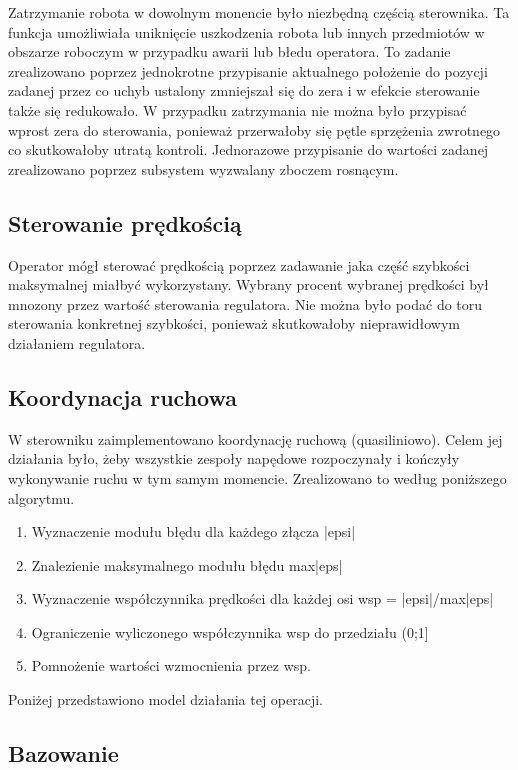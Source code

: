 Zatrzymanie robota w dowolnym monencie było niezbędną częścią sterownika. Ta funkcja umożliwiała uniknięcie uszkodzenia robota lub innych przedmiotów w obszarze roboczym w przypadku awarii lub błedu operatora. To zadanie zrealizowano poprzez jednokrotne przypisanie aktualnego położenie do pozycji zadanej przez co uchyb ustalony zmniejszał się do zera i w efekcie sterowanie także się redukowało. W przypadku zatrzymania nie można było przypisać wprost zera do sterowania, ponieważ przerwałoby się pętle sprzężenia zwrotnego co skutkowałoby utratą kontroli.
Jednorazowe przypisanie do wartości zadanej zrealizowano poprzez subsystem wyzwalany zboczem rosnącym.

\subsection{Sterowanie prędkością}
\label{subsec:sterowaniePredkoscia}

Operator mógł sterować prędkością poprzez zadawanie jaka część szybkości maksymalnej miałbyć wykorzystany. Wybrany procent wybranej prędkości był mnozony przez wartość sterowania regulatora. Nie można było podać do toru sterowania konkretnej szybkości, ponieważ skutkowałoby nieprawidłowym działaniem regulatora.

\subsection{Koordynacja ruchowa}
\label{subsec:koordynacjaRuchowa}

W sterowniku zaimplementowano koordynację ruchową (quasiliniowo). Celem jej działania było, żeby wszystkie zespoły napędowe rozpoczynały i kończyły wykonywanie ruchu w tym samym momencie. Zrealizowano to według poniższego algorytmu.
\begin{enumerate}
\item Wyznaczenie modułu błędu dla każdego złącza |epsi|
\item Znalezienie maksymalnego modułu błędu max|eps|
\item Wyznaczenie współczynnika prędkości dla każdej osi wsp = |epsi|/max|eps|
\item Ograniczenie wyliczonego współczynnika wsp do przedziału (0;1] 
\item Pomnożenie wartości wzmocnienia przez wsp.
\end{enumerate}
Poniżej przedstawiono model działania tej operacji.

\subsection{Bazowanie}
\label{subsec:Bazowanie}

